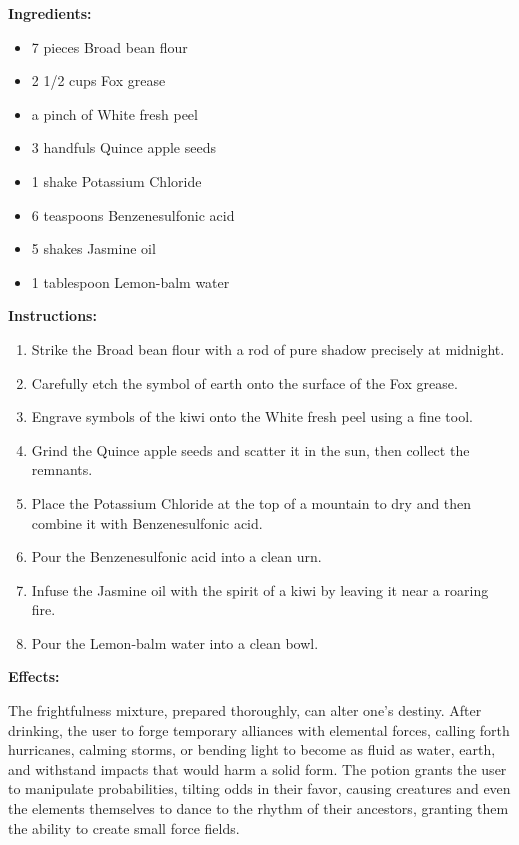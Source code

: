 \documentclass{article}
\begin{document}
\textbf{Ingredients:}

\begin{itemize}
  \item 7 pieces Broad bean flour
  \item 2 1/2 cups Fox grease
  \item a pinch of White fresh peel
  \item 3 handfuls Quince apple seeds
  \item 1 shake Potassium Chloride
  \item 6 teaspoons Benzenesulfonic acid
  \item 5 shakes Jasmine oil
  \item 1 tablespoon Lemon-balm water
\end{itemize}

\textbf{Instructions:}

\begin{enumerate}
  \item Strike the Broad bean flour with a rod of pure shadow precisely at midnight.
  \item Carefully etch the symbol of earth onto the surface of the Fox grease.
  \item Engrave symbols of the kiwi onto the White fresh peel using a fine tool.
  \item Grind the Quince apple seeds and scatter it in the sun, then collect the remnants.
  \item Place the Potassium Chloride at the top of a mountain to dry and then combine it with Benzenesulfonic acid.
  \item Pour the Benzenesulfonic acid into a clean urn.
  \item Infuse the Jasmine oil with the spirit of a kiwi by leaving it near a roaring fire.
  \item Pour the Lemon-balm water into a clean bowl.
\end{enumerate}

\textbf{Effects:}

The frightfulness mixture, prepared thoroughly, can alter one's destiny. After drinking, the user to forge temporary alliances with elemental forces, calling forth hurricanes, calming storms, or bending light to become as fluid as water, earth, and withstand impacts that would harm a solid form. The potion grants the user to manipulate probabilities, tilting odds in their favor, causing creatures and even the elements themselves to dance to the rhythm of their ancestors, granting them the ability to create small force fields.
\end{document}
